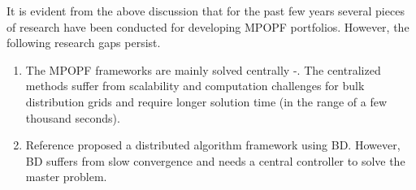 \documentclass{article}
\begin{document}
It is evident from the above discussion that for the past few years several pieces of research have been conducted for developing MPOPF portfolios. However, the following research gaps persist.
\begin{enumerate}
    \item The MPOPF frameworks are mainly solved centrally \cite{Gabash}-\cite{Usman}. The centralized methods suffer from scalability and computation challenges for bulk distribution grids and require longer solution time (in the range of a few thousand seconds).
    \item Reference \cite{Wu} proposed a distributed algorithm framework using BD. However, BD suffers from slow convergence and needs a central controller to solve the master problem. 
\end{enumerate}
\end{document}
